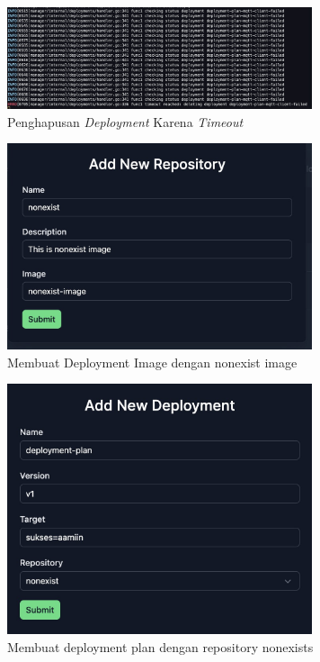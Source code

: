 \begin{figure}[ht]
  \centering
  \includegraphics[width=0.8\textwidth]{resources/chapter-4/pengujian/pengujian-sistem-gagal-04.jpg}
  \caption{Penghapusan \textit{Deployment} Karena \textit{Timeout}}
  \label{fig:pengujian-sistem-gagal-03}
\end{figure}

\begin{figure}[ht]
  \centering
  \includegraphics[width=0.8\textwidth]{resources/chapter-4/pengujian/pengujian-sistem-gagal-06.jpg}
  \caption{Membuat Deployment Image dengan nonexist image}
  \label{fig:pengujian-sistem-gagal-06}
\end{figure}

\begin{figure}[ht]
  \centering
  \includegraphics[width=0.8\textwidth]{resources/chapter-4/pengujian/pengujian-sistem-gagal-07.jpg}
  \caption{Membuat deployment plan dengan repository nonexists}
  \label{fig:pengujian-sistem-gagal-07}
\end{figure}

